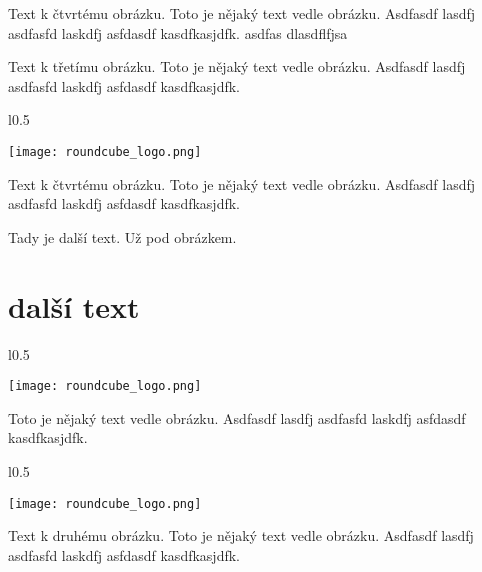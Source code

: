 \documentclass[12pt,a4paper,twoside]{book}
\begin{document}
Text k čtvrtému obrázku. Toto je nějaký text vedle obrázku. Asdfasdf lasdfj asdfasfd laskdfj asfdasdf kasdfkasjdfk.
\newline
asdfas dlasdflfjsa 

Text k třetímu obrázku. Toto je nějaký text vedle obrázku. Asdfasdf lasdfj asdfasfd laskdfj asfdasdf kasdfkasjdfk.
\newline

\begin{wrapfigure}{l}{0.5\textwidth}
  \vspace{-20pt}
  \begin{center}
    \texttt{[image: roundcube\_logo.png]}
  \end{center}
  \vspace{-20pt}
\end{wrapfigure}

Text k čtvrtému obrázku. Toto je nějaký text vedle obrázku. Asdfasdf lasdfj asdfasfd laskdfj asfdasdf kasdfkasjdfk.
\newline


Tady je další text. Už pod obrázkem.

\section{další  text}

\begin{wrapfigure}{l}{0.5\textwidth}
  \vspace{-30pt}
  \begin{center}
    \texttt{[image: roundcube\_logo.png]}
  \end{center}
  \vspace{-10pt}
\end{wrapfigure}

Toto je nějaký text vedle obrázku. Asdfasdf lasdfj asdfasfd laskdfj asfdasdf kasdfkasjdfk.
\newline

\begin{wrapfigure}{l}{0.5\textwidth}
  \vspace{-20pt}
  \begin{center}
    \texttt{[image: roundcube\_logo.png]}
  \end{center}
  \vspace{-20pt}
\end{wrapfigure}

Text k druhému obrázku. Toto je nějaký text vedle obrázku. Asdfasdf lasdfj asdfasfd laskdfj asfdasdf kasdfkasjdfk.
\newline
\end{document}
